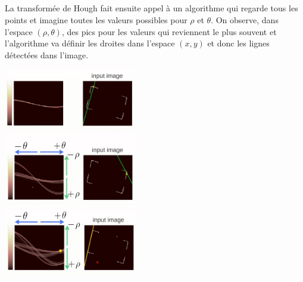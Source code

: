 \subparagraph{}
La transform\'ee de Hough fait ensuite appel \`a un algorithme qui regarde tous les points et imagine toutes les valeurs possibles pour $\rho$ et $\theta$.
On observe, dans l'espace $(\rho, \theta)$, des pics pour les valeurs qui reviennent le plus souvent et l'algorithme va d\'efinir les droites dans l'espace $(x, y)$ et donc les lignes d\'etect\'ees dans l'image.
\begin{center}
\includegraphics[height=3cm]{images/hough_5.png} \\
\includegraphics[height=3cm]{images/hough_6.png} \\ 
\includegraphics[height=3cm]{images/hough_7.png}
\end{center}